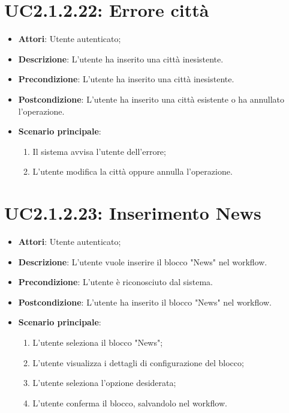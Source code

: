 \section{UC2.1.2.22: Errore città }
\label{UC2.1.2.22}
\begin{itemize}
	\item \textbf{Attori}: Utente autenticato;
	\item \textbf{Descrizione}: L'utente ha inserito una città inesistente. 
	\item \textbf{Precondizione}: L'utente ha inserito una città inesistente.
	\item \textbf{Postcondizione}: L'utente ha inserito una città esistente o ha annullato l'operazione.
	\item \textbf{Scenario principale}:
	\begin{enumerate} \item Il sistema avvisa l'utente dell'errore;  \item  L'utente modifica la città oppure annulla l'operazione.\end{enumerate}
\end{itemize}


\section{UC2.1.2.23: Inserimento News}
\label{UC2.1.2.23}
\begin{itemize}
	\item \textbf{Attori}: Utente autenticato;
	\item \textbf{Descrizione}: L'utente vuole inserire il blocco "News" nel workflow.
	\item \textbf{Precondizione}: L'utente è riconosciuto dal sistema.
	\item \textbf{Postcondizione}: L'utente ha inserito il blocco "News" nel workflow.
	\item \textbf{Scenario principale}:
	\begin{enumerate} \item L'utente seleziona il blocco "News";  \item L'utente visualizza i dettagli di configurazione del blocco; \item  L'utente seleziona l'opzione desiderata;  \item  L'utente conferma il blocco, salvandolo nel workflow.\end{enumerate}
\end{itemize}

